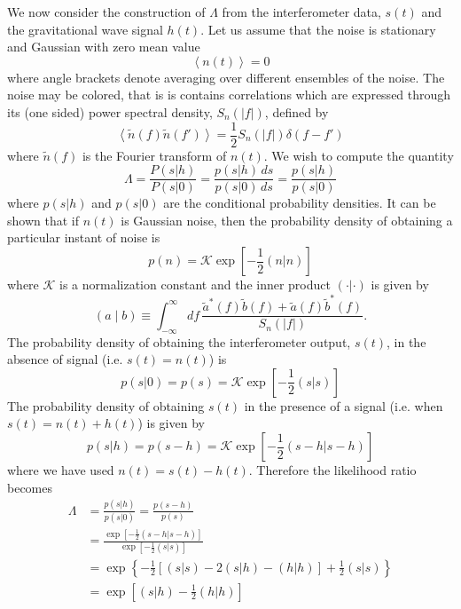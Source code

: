 We now consider the construction of $\Lambda$ from the interferometer data,
$s(t)$ and the gravitational wave signal $h(t)$. Let us assume that the noise
is stationary and Gaussian with zero mean value
\begin{equation}
\left\langle n(t) \right\rangle = 0
\end{equation}
where angle brackets denote averaging over different ensembles of the
noise. The noise may be colored, that is is contains correlations which are
expressed through its (one sided) power spectral density, $S_n(|f|)$, defined
by
\begin{equation}
\left\langle \tilde{n}(f) \tilde{n}(f') \right\rangle = \frac{1}{2} S_n(|f|)
\delta(f-f')
\label{eq:ospsddef}
\end{equation}
where $\tilde{n}(f)$ is the Fourier transform of $n(t)$. We wish to compute
the quantity
\begin{equation}
\Lambda = \frac{P(s|h)}{P(s|0)} = 
\frac{p(s|h)\,ds}{p(s|0)\,ds} = \frac{p(s|h)}{p(s|0)}
\end{equation}
where $p(s|h)$ and $p(s|0)$ are the conditional probability densities.  It can
be shown that if $n(t)$ is Gaussian noise, then the probability density of
obtaining a particular instant of noise is\cite{Finn:1992wt}
\begin{equation}
p(n) = \mathcal{K} \exp\left[-\frac{1}{2} (n|n)\right]
\end{equation}
where $\mathcal{K}$ is a normalization constant and the inner product
$(\cdot|\cdot)$ is given by
\begin{equation}
\label{eq:fullinnerproduct}
  (a\mid b) \equiv \int_{-\infty}^\infty df\,
  \frac{\tilde{a}^\ast(f)\tilde{b}(f)+\tilde{a}(f)\tilde{b}^\ast(f)}
       {S_n(|f|)}.
\end{equation}
The probability density of obtaining the interferometer output, $s(t)$, in the
absence of signal (i.e. $s(t) = n(t)$) is
\begin{equation}
p(s|0) = p(s) = \mathcal{K} \exp\left[-\frac{1}{2} (s|s)\right]
\end{equation}
The probability density of obtaining $s(t)$ in the presence of a signal (i.e.
when $s(t) = n(t) + h(t)$) is given by 
\begin{equation}
p(s|h) = p(s-h) = \mathcal{K} \exp\left[-\frac{1}{2} (s-h|s-h)\right]
\end{equation}
where we have used $n(t) = s(t) - h(t)$. Therefore the likelihood ratio
becomes
\begin{equation}
\begin{split}
\Lambda &= \frac{p(s|h)}{p(s|0)} = \frac{p(s-h)}{p(s)} \\
&= \frac{\exp\left[-\frac{1}{2} (s-h|s-h)\right]}{\exp\left[-\frac{1}{2} (s|s)\right]} \\
&= \exp\left\{-\frac{1}{2}\left[(s|s) - 2(s|h) - (h|h)\right] + \frac{1}{2}(s|s)\right\} \\
&= \exp\left[(s|h) - \frac{1}{2}(h|h)\right]
\end{split}
\end{equation}
